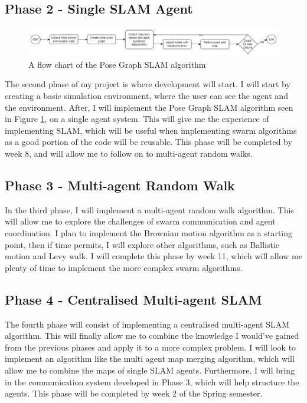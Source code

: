 \documentclass[12pt]{article}
\begin{document}
\subsection{Phase 2 - Single SLAM Agent}

\begin{figure}[h]
    \centering
    \includegraphics[width=1\linewidth]{flowchart.png}
    \caption{A flow chart of the Pose Graph SLAM algorithm}
    \label{fig:flowchart}
\end{figure}

The second phase of my project is where development will start. I will start by creating a basic simulation environment, where
the user can see the agent and the environment. After, I will implement the Pose Graph SLAM algorithm seen in Figure \ref{fig:flowchart},
on a single agent system. This will give me the experience of implementing SLAM, which will be useful when implementing swarm
algorithms as a good portion of the code will be reusable. This phase will be completed by week 8, and will allow me to follow
on to multi-agent random walks.

\subsection{Phase 3 - Multi-agent Random Walk}
In the third phase, I will implement a multi-agent random walk algorithm. This will allow me to explore the challenges of swarm
communication and agent coordination. I plan to implement the Brownian motion algorithm as a starting point, then if time permits,
I will explore other algorithms, such as Ballistic motion and Levy walk. I will complete this phase by week 11, which will allow me
plenty of time to implement the more complex swarm algorithms.
\subsection{Phase 4 - Centralised Multi-agent SLAM}
The fourth phase will consist of implementing a centralised multi-agent SLAM algorithm. This will finally allow me to combine
the knowledge I would've gained from the previous phases and apply it to a more complex problem. I will look to implement an
algorithm like the multi agent map merging algorithm, which will allow me to combine the maps of single SLAM agents. Furthermore,
I will bring in the communication system developed in Phase 3, which will help structure the agents. This phase will be completed by
week 2 of the Spring semester.
\end{document}
